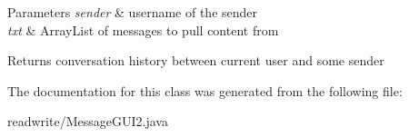 \begin{DoxyParams}{Parameters}
{\em sender} & username of the sender \\
\hline
{\em txt} & Array\+List of messages to pull content from \\
\hline
\end{DoxyParams}
\begin{DoxyReturn}{Returns}
conversation history between current user and some sender 
\end{DoxyReturn}


The documentation for this class was generated from the following file\+:\begin{DoxyCompactItemize}
\item 
readwrite/Message\+G\+U\+I2.\+java\end{DoxyCompactItemize}
